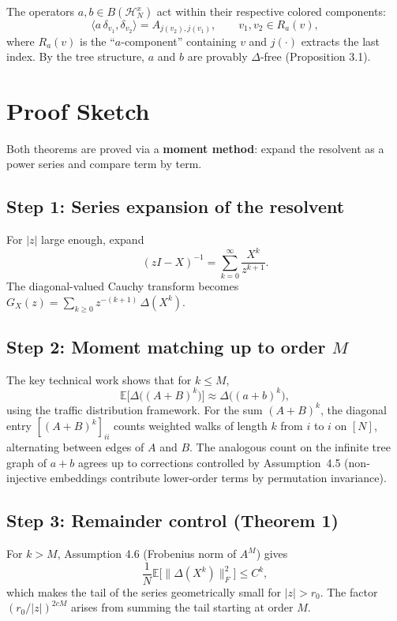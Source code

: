 \documentclass[11pt,a4paper]{article}
\begin{document}
The operators $a,b\in B(\mathcal{H}_N^x)$ act within their respective colored components:
\[
  \langle a\,\delta_{v_1},\delta_{v_2}\rangle = A_{j(v_2),j(v_1)}, \qquad v_1,v_2 \in R_a(v),
\]
where $R_a(v)$ is the ``$a$-component'' containing $v$ and $j(\cdot)$ extracts the last index. By the tree structure, $a$ and $b$ are provably $\Delta$-free (Proposition 3.1).

\section{Proof Sketch}

Both theorems are proved via a \textbf{moment method}: expand the resolvent as a power series and compare term by term.

\subsection*{Step 1: Series expansion of the resolvent}

For $|z|$ large enough, expand
\[
  (zI - X)^{-1} = \sum_{k=0}^\infty \frac{X^k}{z^{k+1}}.
\]
The diagonal-valued Cauchy transform becomes $G_X(z) = \sum_{k\ge 0} z^{-(k+1)}\,\Delta(X^k)$.

\subsection*{Step 2: Moment matching up to order $M$}

The key technical work shows that for $k\le M$,
\[
  \mathbb{E}\bigl[\Delta\bigl((A+B)^k\bigr)\bigr] \approx \Delta\bigl((a+b)^k\bigr),
\]
using the traffic distribution framework. For the sum $(A+B)^k$, the diagonal entry $[(A+B)^k]_{ii}$ counts weighted walks of length $k$ from $i$ to $i$ on $[N]$, alternating between edges of $A$ and $B$. The analogous count on the infinite tree graph of $a+b$ agrees up to corrections controlled by Assumption~4.5 (non-injective embeddings contribute lower-order terms by permutation invariance).

\subsection*{Step 3: Remainder control (Theorem 1)}

For $k > M$, Assumption 4.6 (Frobenius norm of $A^M$) gives
\[
  \frac{1}{N}\mathbb{E}\bigl[\|\Delta(X^k)\|_F^2\bigr] \le C^{k},
\]
which makes the tail of the series geometrically small for $|z|>r_0$. The factor $(r_0/|z|)^{2cM}$ arises from summing the tail starting at order $M$.
\end{document}

